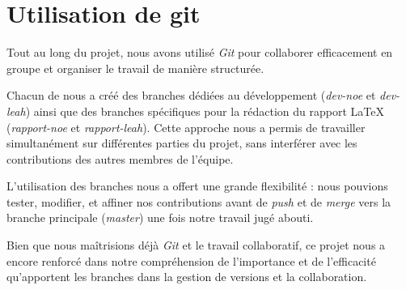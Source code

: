 \section{Utilisation de git}

Tout au long du projet, nous avons utilisé \textit{Git} pour collaborer efficacement en groupe et organiser le travail de manière structurée.  

Chacun de nous a créé des branches dédiées au développement (\textit{dev-noe} et \textit{dev-leah}) ainsi que des branches spécifiques pour la rédaction du rapport LaTeX (\textit{rapport-noe} et \textit{rapport-leah}). Cette approche nous a permis de travailler simultanément sur différentes parties du projet, sans interférer avec les contributions des autres membres de l’équipe.  

L’utilisation des branches nous a offert une grande flexibilité : nous pouvions tester, modifier, et affiner nos contributions avant de \textit{push} et de \textit{merge} vers la branche principale (\textit{master}) une fois notre travail jugé abouti.  

Bien que nous maîtrisions déjà \textit{Git} et le travail collaboratif, ce projet nous a encore renforcé dans notre compréhension de l’importance et de l’efficacité qu’apportent les branches dans la gestion de versions et la collaboration.
